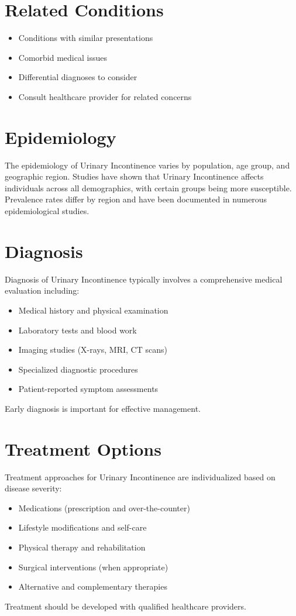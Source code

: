 \section*{Related Conditions}
\begin{itemize}
  \item Conditions with similar presentations
  \item Comorbid medical issues
  \item Differential diagnoses to consider
  \item Consult healthcare provider for related concerns
\end{itemize}

\section*{Epidemiology}
The epidemiology of Urinary Incontinence varies by population, age group, and geographic region. Studies have shown that Urinary Incontinence affects individuals across all demographics, with certain groups being more susceptible. Prevalence rates differ by region and have been documented in numerous epidemiological studies.

\section*{Diagnosis}
Diagnosis of Urinary Incontinence typically involves a comprehensive medical evaluation including:
\begin{itemize}
  \item Medical history and physical examination
  \item Laboratory tests and blood work
  \item Imaging studies (X-rays, MRI, CT scans)
  \item Specialized diagnostic procedures
  \item Patient-reported symptom assessments
\end{itemize}
Early diagnosis is important for effective management.

\section*{Treatment Options}
Treatment approaches for Urinary Incontinence are individualized based on disease severity:
\begin{itemize}
  \item Medications (prescription and over-the-counter)
  \item Lifestyle modifications and self-care
  \item Physical therapy and rehabilitation
  \item Surgical interventions (when appropriate)
  \item Alternative and complementary therapies
\end{itemize}
Treatment should be developed with qualified healthcare providers.

